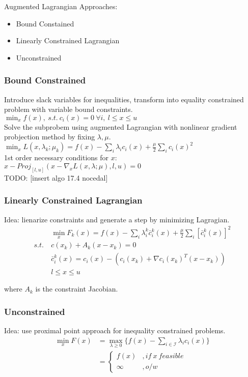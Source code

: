 \documentclass[8pt,letter]{article}
\begin{document}
\begin{multicols*}{2}
  Augmented Lagrangian Approaches:
  \begin{itemize}
  \item Bound Constained
  \item Linearly Constrained Lagrangian
  \item Unconstrained
  \end{itemize}

  \subsubsection{Bound Constrained}
  Introduce slack variables for inequalities, transform into equality constrained problem with variable bound constraints.\\

  $\min_x f(x),\ s.t.\ c_i(x) = 0\ \forall i,\ l \leq x \leq u$\\
  
  Solve the subprobem using augmented Lagrangian with nonlinear gradient probjection method by fixing $\lambda, \mu$.\\
  $\min_x L(x, \lambda_k; \mu_k) = f(x) - \sum_i \lambda_i c_i(x) + \frac{\mu}{2}\sum_i c_i(x)^2$\\
  
  1st order necessary conditions for $x$:\\
  $x - Proj_{[l,u]}(x-\nabla_x L(x,\lambda; \mu), l, u) = 0$\\

  TODO: [insert algo 17.4 nocedal]

  \subsubsection{Linearly Constrained Lagrangian}
  Idea: lienarize constraints and generate a step by minimizing Lagragian.
  \begin{align*}
    & \min_x F_k(x) = f(x) - \sum_i \lambda_i^k \bar{c}_i^k(x) + \frac{\mu}{2} \sum_i [\bar{c}_i^k(x)]^2\\
    s.t.\ & c(x_k) + A_k(x-x_k)=0\\
    & \bar{c}_i^k(x) = c_i(x) - (c_i(x_k) + \nabla c_i(x_k)^T (x-x_k))\\
    & l \leq x \leq u
  \end{align*}

  where $A_k$ is the constraint Jacobian.\\

  \subsubsection{Unconstrained}
  Idea: use proximal point approach for inequality constrained problems.
  \begin{align*}
    \min_x F(x) & = \max_{\lambda \geq 0} \{f(x) - \sum_{i \in \mathcal{I}} \lambda_i c_i(x) \} \\
    &= \begin{cases}
        f(x) &, if\ x\ feasible\\
        \infty &, o/w
    \end{cases}
  \end{align*}
  

\end{multicols*}
\end{document}
